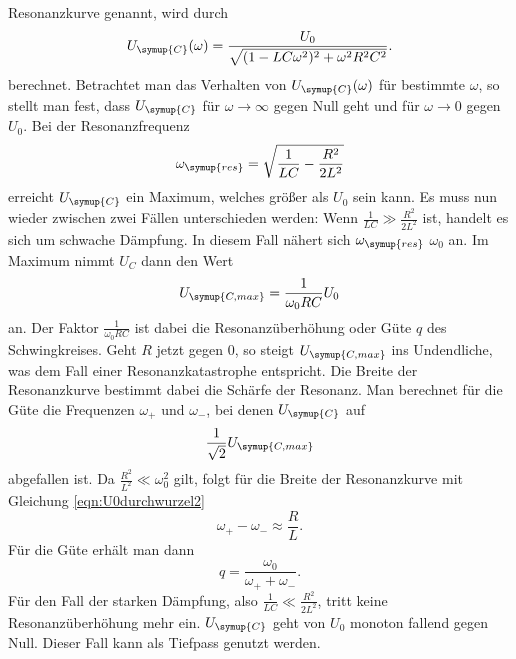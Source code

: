 Resonanzkurve genannt, wird durch
\begin{equation}
  U_\symup{C}(\omega) = \frac{U_0}{\sqrt{(1-L C \omega^2)^2 + \omega^2 R^2 C^2}}.
  \label{eqn:resonanzkurve}
\end{equation}
berechnet. Betrachtet man das Verhalten von $U_\symup{C}(\omega)$ für bestimmte
$\omega$, so stellt man fest, dass $U_\symup{C}$ für $\omega \to \infty$ gegen
Null geht und für $\omega \to 0$ gegen $U_0$. Bei der Resonanzfrequenz
\begin{equation}
  \omega_\symup{res} = \sqrt{\frac{1}{L C}-\frac{R^2}{2L^2}}
  \label{eqn:resonanzfrequenz}
\end{equation}
erreicht $U_\symup{C}$ ein Maximum, welches größer als $U_0$ sein kann.
Es muss nun wieder zwischen zwei Fällen unterschieden werden:\newline
Wenn $\frac{1}{L C} \gg \frac{R^2}{2 L^2}$ ist, handelt es sich um schwache Dämpfung.
In diesem Fall nähert sich $\omega_\symup{res}$ $\omega_0$ an. Im Maximum nimmt
$U_C$ dann den Wert
\begin{equation}
  U_\symup{C,max} = \frac{1}{\omega_0 R C} U_0
  \label{eqn:Ucmax}
\end{equation}
an. Der Faktor $\frac{1}{\omega_0 R C}$ ist dabei die Resonanzüberhöhung oder
Güte $q$ des Schwingkreises. Geht $R$ jetzt gegen 0, so steigt $U_\symup{C,max}$
ins Undendliche, was dem Fall einer Resonanzkatastrophe entspricht.
Die Breite der Resonanzkurve bestimmt dabei die Schärfe der Resonanz. Man berechnet
für die Güte die Frequenzen $\omega_+$ und $\omega_-$, bei denen $U_\symup{C}$ auf
\begin{equation}
  \frac{1}{\sqrt{2}}U_\symup{C,max}
  \label{eqn:U0durchwurzel2}
\end{equation}
abgefallen ist.
Da $\frac{R^2}{L^2} \ll \omega_0^2$ gilt, folgt für die Breite der Resonanzkurve
mit Gleichung \eqref{eqn:U0durchwurzel2}
\begin{equation}
  \omega_+ - \omega_- \approx \frac{R}{L}.
  \label{eqn:breite_resonanzkurve}
\end{equation}
Für die Güte erhält man dann
\begin{equation}
  q = \frac{\omega_0}{\omega_+ + \omega_-}.
  \label{eqn:guete}
\end{equation}
Für den Fall der starken Dämpfung, also $\frac{1}{L C} \ll \frac{R^2}{2 L^2}$, tritt
keine Resonanzüberhöhung mehr ein. $U_\symup{C}$ geht von $U_0$ monoton fallend
gegen Null. Dieser Fall kann als Tiefpass genutzt werden.
\cite{sample}

